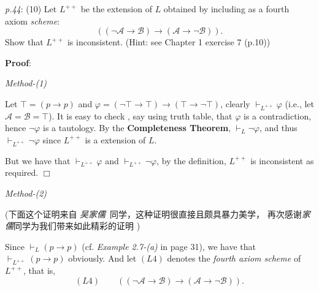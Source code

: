 \documentclass[UTF8,12pt,a4paper]{ctexart}
\begin{document}
\vspace{2em}  
\noindent\emph{p.44}: (10) \quad
Let $L^{++}$ be the extension of $L$ obtained by including as a fourth axiom \textit{scheme}:
\[
( (\neg \mathscr{A} \to \mathscr{B}) \to (\mathscr{A} \to \neg \mathscr{B})).
\]
Show that $L^{++}$ is inconsistent. (Hint: see Chapter 1 exercise 7 (p.10)) 


\noindent\textbf{Proof}:

\noindent\textit{Method-(1)}

Let 
$\top = (p \to p)$ and $\varphi = (\neg \top \to \top)  \to (\top \to \neg \top)$,
clearly $ \vdash_{L^{++}} \varphi$ (i.e., let $\mathscr{A} = \mathscr{B} = \top$). 
It is easy to check , 
say using truth table, that $\varphi$ is a contradiction, 
hence $\neg \varphi$ is a tautology. 
By the \textbf{Completeness Theorem}, $\vdash_L \neg \varphi$, 
and thus $\vdash_{L^{++}} \neg \varphi$ since $L^{++}$ is a extension of $L$.

But we have that $\vdash_{L^{++}} \varphi$ and $\vdash_{L^{++}} \neg \varphi$, by the definition, $L^{++}$ is inconsistent as required.
\hfill $\Box$


\noindent\textit{Method-(2)}

(下面这个证明来自 \textit{吴家儒}\ 同学，这种证明很直接且颇具暴力美学，
再次感谢\textit{家儒}同学为我们带来如此精彩的证明 \faHeart[regular] \faHeart[regular] \faHeart[regular])

Since $\vdash_L (p \to p)$ (cf. \textit{Example 2.7-(a)} in page 31),  we have that
$
\vdash_{L^{++}} (p \to p)
$ obviously.
And let $(L4)$ denotes the  \textit{fourth axiom scheme} of $L^{++}$, that is,
\[
(L4) \qquad ( (\neg \mathscr{A} \to \mathscr{B}) \to (\mathscr{A} \to \neg \mathscr{B})).
\]
\end{document}

